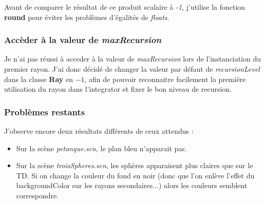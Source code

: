 \documentclass{article}
\begin{document}
Avant de comparer le résultat de ce produit scalaire à \textit{-1}, j'utilise la
fonction \textbf{round} pour éviter les problèmes d'égalités de \textit{floats}.\\

\subsubsection*{Accèder à la valeur de \textit{maxRecursion}}
Je n'ai pas réussi à acceder à la valeur de \textit{maxRecursion} lors de
l'instanciation du premier rayon. J'ai donc décidé de changer la valeur par
défaut de \textit{recursionLevel} dans la classe \textbf{Ray} en $-1$, afin de
pouvoir reconnaitre facilement la première utilisation du rayon dans l'integrator
et fixer le bon niveau de recursion.

\subsubsection*{Problèmes restants}
J'observe encore deux résultats différents de ceux attendus :
\begin{itemize}
\item Sur la scène \textit{petanque.scn}, le plan bleu n'apparait pas.
\item Sur la scène \textit{troisSpheres.scn}, les sphères apparaisent plus claires
que sur le TD. Si on change la couleur du fond en noir (donc que l'on enlève
l'effet du backgroundColor sur les rayons secondaires...) alors les couleurs semblent correspondre.
\end{itemize}
\end{document}
